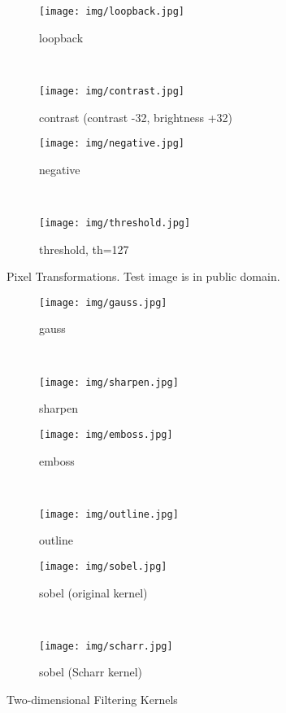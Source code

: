 \begin{figure}[tb!]
\centering
\begin{subfigure}[b]{.49\linewidth}
	\texttt{[image: img/loopback.jpg]}
	\caption{loopback}
\end{subfigure}
~
\begin{subfigure}[b]{.49\linewidth}
	\texttt{[image: img/contrast.jpg]}
	\caption{contrast (contrast -32, brightness +32)}
\end{subfigure}
\par\bigskip
\begin{subfigure}[b]{.49\linewidth}
	\texttt{[image: img/negative.jpg]}
	\caption{negative}
\end{subfigure}
~
\begin{subfigure}[b]{.49\linewidth}
	\texttt{[image: img/threshold.jpg]}
	\caption{threshold, th=127}
\end{subfigure}
\caption{Pixel Transformations. Test image is in public domain.}
\label{fig:pixel-transformations}
\end{figure}

\begin{figure}[tb!]
\centering
\begin{subfigure}[b]{.49\linewidth}
	\texttt{[image: img/gauss.jpg]}
	\caption{gauss}
\end{subfigure}
~
\begin{subfigure}[b]{.49\linewidth}
	\texttt{[image: img/sharpen.jpg]}
	\caption{sharpen}
\end{subfigure}
\par\bigskip
\begin{subfigure}[b]{.49\linewidth}
	\texttt{[image: img/emboss.jpg]}
	\caption{emboss}
\end{subfigure}
~
\begin{subfigure}[b]{.49\linewidth}
	\texttt{[image: img/outline.jpg]}
	\caption{outline}
\end{subfigure}
\par\bigskip
\begin{subfigure}[b]{.49\linewidth}
	\texttt{[image: img/sobel.jpg]}
	\caption{sobel (original kernel)}
\end{subfigure}
~
\begin{subfigure}[b]{.49\linewidth}
	\texttt{[image: img/scharr.jpg]}
	\caption{sobel (Scharr kernel)}
\end{subfigure}
\caption{Two-dimensional Filtering Kernels}
\label{fig:2d-filters}
\end{figure}

